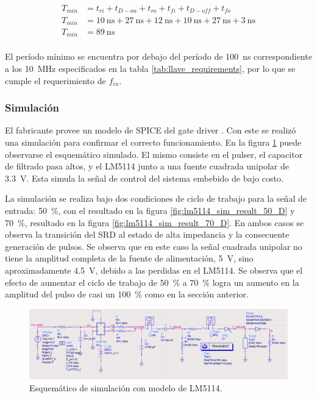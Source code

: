 \begin{equation}
    \begin{aligned}
        T_{min} &= t_{ri} + t_{D-on} + t_{ro} + t_{fi} + t_{D-off} + t_{fo} \\
        T_{min} &= \qty{10}{\nano\second} + \qty{27}{\nano\second} +
        \qty{12}{\nano\second} + \qty{10}{\nano\second} + \qty{27}{\nano\second}
        + \qty{3}{\nano\second} \\
        T_{min} &= \qty{89}{\nano\second} \\
    \end{aligned}
\end{equation}

El período mínimo se encuentra por debajo del período de \qty{100}{\nano\second}
correspondiente a los \qty{10}{\mega\hertz} especificados en
la tabla \ref{tab:llave_requirements}, por lo que se cumple el requerimiento de $f_{in}$.

\subsubsection{Simulación}

El fabricante provee un modelo de SPICE del gate driver \cite{LM5114-PSpice}.
Con este se realizó una simulación para confirmar el correcto funcionamiento. En
la figura \ref{fig:lm5114_sim_sch} puede observarse el esquemático simulado. El
mismo consiste en el pulser, el capacitor de filtrado pasa altos, y el LM5114
junto a una fuente cuadrada unipolar de \qty{3.3}{\volt}. Esta simula la señal
de control del sistema embebido de bajo costo.

La simulación se realiza bajo dos condiciones de ciclo de trabajo para la señal
de entrada: \qty{50}{\percent}, con el resultado en la figura
\ref{fig:lm5114_sim_result_50_D} y \qty{70}{\percent}, resultado en la figura
\ref{fig:lm5114_sim_result_70_D}. En ambos casos se observa la transición del
SRD al estado de alta impedancia y la consecuente generación de pulsos. Se
observa que en este caso la señal cuadrada unipolar no tiene la amplitud
completa de la fuente de alimentación, \qty{5}{\volt}, sino aproximadamente
\qty{4.5}{\volt}, debido a las perdidas en el LM5114. Se observa que el efecto
de aumentar el ciclo de trabajo de \qty{50}{\percent} a \qty{70}{\percent} logra
un aumento en la amplitud del pulso de casi un \qty{100}{\percent} como en la
sección anterior.

\begin{figure}[tbp]
    \centering
    \includegraphics[width=\textwidth]{images/lm5114_sim_sch.png}
    \caption{Esquemático de simulación con modelo de LM5114.}
    \label{fig:lm5114_sim_sch}
\end{figure}


